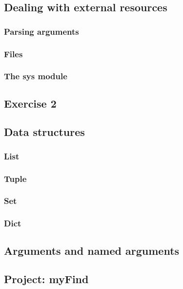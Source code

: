 \subsection{Dealing with external resources}
\subsubsection{Parsing arguments}
\subsubsection{Files}
\subsubsection{The sys module}

\subsection{Exercise 2}

\subsection{Data structures}
\subsubsection{List}
\subsubsection{Tuple}
\subsubsection{Set}
\subsubsection{Dict}

\subsection{Arguments and named arguments}

\subsection{Project: myFind}
